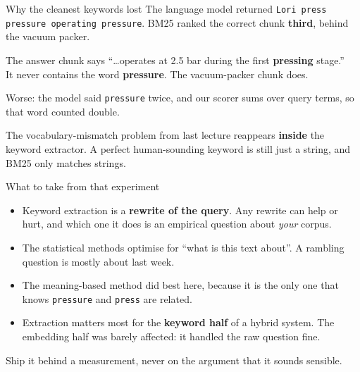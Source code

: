 \documentclass[aspectratio=169]{beamer}
\newcommand{\trapbox}[1]{%
  \begin{tcolorbox}[colback=armred!8, colframe=armred, boxrule=0.6pt, arc=2pt]
  #1
  \end{tcolorbox}}
\newcommand{\takebox}[1]{%
  \begin{tcolorbox}[colback=paramgreen!8, colframe=paramgreen, boxrule=0.6pt, arc=2pt]
  #1
  \end{tcolorbox}}
\begin{document}
\begin{frame}{Why the cleanest keywords lost}
  \vspace{0.5em}
  The language model returned \texttt{Lori press pressure operating pressure}. BM25 ranked
  the correct chunk \textbf{third}, behind the vacuum packer.

  \vspace{0.8em}
  \begin{center}
  \begin{tcolorbox}[colback=lightbg, colframe=gray, boxrule=0.5pt, arc=2pt, width=0.9\textwidth]
    \small
    The answer chunk says ``\ldots operates at 2.5 bar during the first
    \textbf{pressing} stage.''\\
    It never contains the word \textbf{pressure}. The vacuum-packer chunk does.
  \end{tcolorbox}
  \end{center}

  \vspace{0.7em}
  Worse: the model said \texttt{pressure} twice, and our scorer sums over query terms, so
  that word counted double.

  \vspace{0.7em}
  \trapbox{The vocabulary-mismatch problem from last lecture reappears \textbf{inside} the
  keyword extractor. A perfect human-sounding keyword is still just a string, and BM25 only
  matches strings.}
\end{frame}

\begin{frame}{What to take from that experiment}
  \vspace{0.8em}
  \begin{itemize}
    \item Keyword extraction is a \textbf{rewrite of the query}. Any rewrite can help or
      hurt, and which one it does is an empirical question about \emph{your} corpus.
    \item The statistical methods optimise for ``what is this text about''. A rambling
      question is mostly about last week.
    \item The meaning-based method did best here, because it is the only one that knows
      \texttt{pressure} and \texttt{press} are related.
    \item Extraction matters most for the \textbf{keyword half} of a hybrid system. The
      embedding half was barely affected: it handled the raw question fine.
  \end{itemize}

  \vspace{0.8em}
  \takebox{Ship it behind a measurement, never on the argument that it sounds sensible.}
\end{frame}
\end{document}
